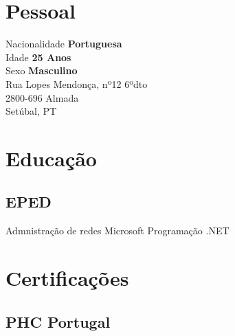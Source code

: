 \documentclass[letterpaper]{deedy-resume} %
\begin{document}

\lastupdated %



\begin{minipage}[t]{0.33\textwidth}

\section{Pessoal} 

Nacionalidade \textbf{Portuguesa}\\
Idade \textbf{25 Anos}\\
Sexo \textbf{Masculino}\\

Rua Lopes Mendonça, nº12 6ºdto\\
2800-696 Almada\\
Setúbal, PT\\

\sectionspace

\section{Educação}
\subsection{EPED}
Admnistração de redes Microsoft
Programação .NET

\sectionspace

\section{Certificações}
\subsection{PHC Portugal}


\end{minipage}
\end{document}
